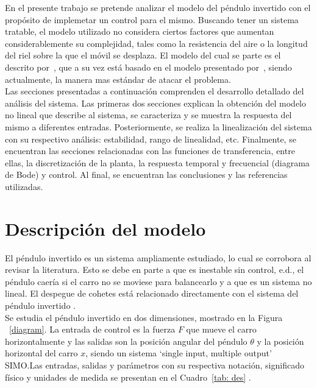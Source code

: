 \documentclass[journal]{IEEEtran}
\begin{document}
En el presente trabajo se pretende analizar
el modelo del péndulo invertido con el propósito de implemetar un control para el mismo. Buscando tener un sistema tratable, el modelo utilizado no considera ciertos factores que aumentan considerablemente su complejidad, tales como la resistencia del aire o la longitud del riel sobre la que el móvil se desplaza. El modelo del cual se parte es el descrito por~\cite{pag}, que a su vez está basado en el modelo presentado por~\cite{Siebert86}, siendo actualmente, la manera mas estándar de atacar el problema.\\

Las secciones presentadas a continuación comprenden el desarrollo detallado del análisis del sistema. Las primeras dos secciones explican la obtención del modelo no lineal que describe al sistema, se caracteriza y se muestra la respuesta del mismo a diferentes entradas. Posteriormente, se realiza la linealización del sistema con su respectivo análisis: estabilidad, rango de linealidad, etc. Finalmente, se encuentran las secciones relacionadas con las funciones de transferencia, entre ellas, la discretización de la planta, la respuesta temporal y frecuencial (diagrama de Bode) y control. Al final, se encuentran las conclusiones y las referencias utilizadas. 

\section{Descripción del modelo\label{sec:descripcion}}
El péndulo invertido es un sistema ampliamente estudiado, lo cual se corrobora al revisar la literatura. Esto se debe en parte a que es inestable sin control, e.d., el péndulo caería si el carro no se moviese para balancearlo y a que es un sistema no lineal. El despegue de cohetes está relacionado directamente con el sistema del péndulo invertido \cite{pag}.\\

Se estudia el péndulo invertido en dos dimensiones, mostrado en la Figura ~\ref{diagram}. La entrada de control es la fuerza $F$ que mueve el carro horizontalmente y las salidas son la posición angular del péndulo $\theta$ y la posición horizontal del carro $x$, siendo un sistema `single input, multiple output' SIMO.\@ Las entradas, salidas y parámetros con su respectiva notación, significado físico y unidades de medida se presentan en el Cuadro~\ref{tab: des} \cite{pag}.
\end{document}
